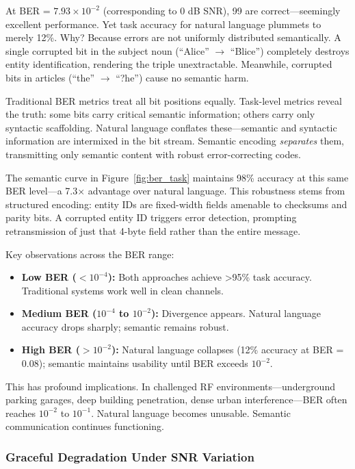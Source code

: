 \documentclass[conference]{IEEEtran}
\begin{document}
At BER = $7.93 \times 10^{-2}$ (corresponding to 0 dB SNR), 99%
are correct—seemingly excellent performance. Yet task accuracy for natural 
language plummets to merely 12\%. Why? Because errors are not uniformly 
distributed semantically. A single corrupted bit in the subject noun 
(``Alice'' $\rightarrow$ ``Blice'') completely destroys entity identification, 
rendering the triple unextractable. Meanwhile, corrupted bits in articles 
(``the'' $\rightarrow$ ``?he'') cause no semantic harm.

Traditional BER metrics treat all bit positions equally. Task-level 
metrics reveal the truth: some bits carry critical semantic information; 
others carry only syntactic scaffolding. Natural language conflates these—semantic 
and syntactic information are intermixed in the bit stream. Semantic 
encoding \textit{separates} them, transmitting only semantic content 
with robust error-correcting codes.

The semantic curve in Figure~\ref{fig:ber_task} maintains 98\% accuracy 
at this same BER level—a 7.3× advantage over natural language. This 
robustness stems from structured encoding: entity IDs are fixed-width 
fields amenable to checksums and parity bits. A corrupted entity ID 
triggers error detection, prompting retransmission of just that 4-byte 
field rather than the entire message.

Key observations across the BER range:

\begin{itemize}
\item \textbf{Low BER ($< 10^{-4}$):} Both approaches achieve >95\% task 
      accuracy. Traditional systems work well in clean channels.
\item \textbf{Medium BER ($10^{-4}$ to $10^{-2}$):} Divergence appears. 
      Natural language accuracy drops sharply; semantic remains robust.
\item \textbf{High BER ($> 10^{-2}$):} Natural language collapses (12\% 
      accuracy at BER = 0.08); semantic maintains usability until BER 
      exceeds $10^{-2}$.
\end{itemize}

This has profound implications. In challenged RF environments—underground 
parking garages, deep building penetration, dense urban interference—BER 
often reaches $10^{-2}$ to $10^{-1}$. Natural language becomes unusable. 
Semantic communication continues functioning.

\subsubsection{Graceful Degradation Under SNR Variation}
\end{document}
